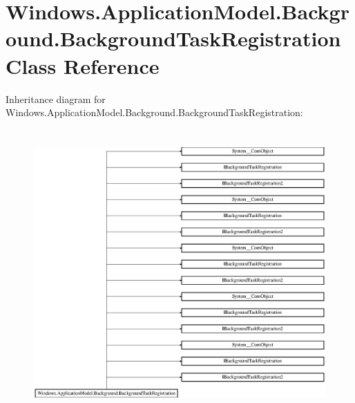 \hypertarget{class_windows_1_1_application_model_1_1_background_1_1_background_task_registration}{}\section{Windows.\+Application\+Model.\+Background.\+Background\+Task\+Registration Class Reference}
\label{class_windows_1_1_application_model_1_1_background_1_1_background_task_registration}
Inheritance diagram for Windows.\+Application\+Model.\+Background.\+Background\+Task\+Registration\+:\begin{figure}[H]
\begin{center}
\leavevmode
\includegraphics[height=10.980392cm]{class_windows_1_1_application_model_1_1_background_1_1_background_task_registration}
\end{center}
\end{figure}
